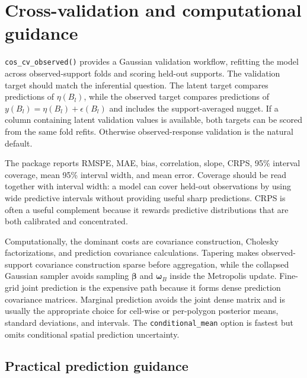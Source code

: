 \documentclass[11pt]{article}
\newcommand{\bbeta}{\bm{\beta}}
\newcommand{\bw}{\bm{\omega}}
\begin{document}
\section{Cross-validation and computational guidance}

\texttt{cos\_cv\_observed()} provides a Gaussian validation workflow, refitting
the model across observed-support folds and scoring held-out supports. The validation
target should match the inferential question. The latent target compares
predictions of \(\eta(B_l)\), while the observed target compares predictions
of \(y(B_l)=\eta(B_l)+\epsilon(B_l)\) and includes the support-averaged nugget.
If a column containing latent validation values is available, both targets can
be scored from the same fold refits. Otherwise observed-response validation is
the natural default.

The package reports RMSPE, MAE, bias, correlation, slope, CRPS, 95\% interval
coverage, mean 95\% interval width, and mean error. Coverage should be read
together with interval width: a model can cover held-out observations by using
wide predictive intervals without providing useful sharp predictions. CRPS is
often a useful complement because it rewards predictive distributions that are
both calibrated and concentrated.

Computationally, the dominant costs are covariance construction, Cholesky
factorizations, and prediction covariance calculations. Tapering makes
observed-support covariance construction sparse before aggregation, while the
collapsed Gaussian sampler avoids sampling \(\bbeta\) and \(\bw_B\) inside the
Metropolis update. Fine-grid joint prediction is the expensive path because it
forms dense prediction covariance matrices. Marginal prediction avoids the
joint dense matrix and is usually the appropriate choice for cell-wise or
per-polygon posterior means, standard deviations, and intervals. The
\texttt{conditional\_mean} option is fastest but omits conditional spatial
prediction uncertainty.

\subsection{Practical prediction guidance}
\end{document}
